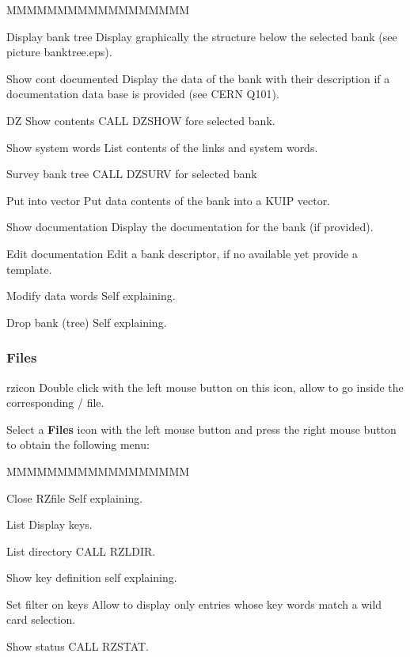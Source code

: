 \begin{DLsf}{MMMMMMMMMMMMMMMMMM}
\item[Display bank tree]         Display graphically the structure below the 
                                 selected bank (see picture banktree.eps).
\item[Show cont documented]      Display the data of the bank with their
                                 description if a documentation data base is
                                 provided (see CERN Q101).
\item[DZ Show contents]          CALL DZSHOW fore selected bank.
\item[Show system words]         List contents of the links and system words.
\item[Survey bank tree]          CALL DZSURV for selected bank
\item[Put into vector]           Put data contents of the bank into a KUIP
                                 vector.
\item[Show documentation]        Display the documentation for the bank 
                                 (if provided).
\item[Edit documentation]        Edit a bank descriptor, if no available yet
                                 provide a template.
\item[Modify data words]         Self explaining.
\item[Drop bank (tree)]          Self explaining.
\end{DLsf}


\subsubsection{\RZ{} Files}
\begin{ICON}{rzicon}
Double click with the left mouse button on this icon, allow to go inside the
corresponding \ZEBRA/\RZ{} file.
\end{ICON}

Select a {\bf \RZ{} Files} icon with the left mouse button and press
the right mouse button to obtain the following menu:


\begin{DLsf}{MMMMMMMMMMMMMMMMMM}
\item[Close RZfile]        Self explaining.
\item[List]                Display keys.
\item[List directory]      CALL RZLDIR.
\item[Show key definition] self explaining.
\item[Set filter on keys]  Allow to display only entries whose key words
                           match a wild card selection.
\item[Show status]         CALL RZSTAT.
\end{DLsf}


